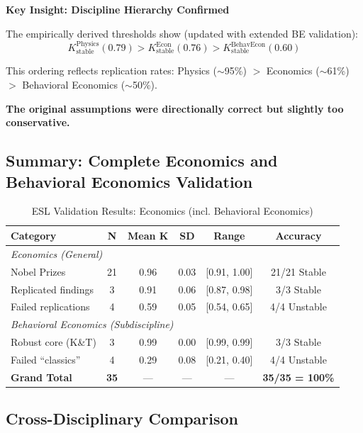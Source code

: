 \documentclass[11pt,a4paper]{article}
\begin{document}
\begin{resultbox}
\textbf{Key Insight: Discipline Hierarchy Confirmed}

The empirically derived thresholds show (updated with extended BE validation):
\[
K_{\text{stable}}^{\text{Physics}} (0.79) > K_{\text{stable}}^{\text{Econ}} (0.76) > K_{\text{stable}}^{\text{BehavEcon}} (0.60)
\]

This ordering reflects replication rates: Physics ($\sim$95\%) $>$ Economics ($\sim$61\%) $>$ Behavioral Economics ($\sim$50\%).

\textbf{The original assumptions were directionally correct but slightly too conservative.}
\end{resultbox}

\subsection{Summary: Complete Economics and Behavioral Economics Validation}

\begin{table}[h]
\centering
\caption{ESL Validation Results: Economics (incl. Behavioral Economics)}
\begin{tabular}{lccccc}
\toprule
\textbf{Category} & \textbf{N} & \textbf{Mean K} & \textbf{SD} & \textbf{Range} & \textbf{Accuracy} \\
\midrule
\multicolumn{6}{l}{\textit{Economics (General)}} \\
Nobel Prizes & 21 & 0.96 & 0.03 & [0.91, 1.00] & 21/21 Stable \\
Replicated findings & 3 & 0.91 & 0.06 & [0.87, 0.98] & 3/3 Stable \\
Failed replications & 4 & 0.59 & 0.05 & [0.54, 0.65] & 4/4 Unstable \\
\midrule
\multicolumn{6}{l}{\textit{Behavioral Economics (Subdiscipline)}} \\
Robust core (K\&T) & 3 & 0.99 & 0.00 & [0.99, 0.99] & 3/3 Stable \\
Failed ``classics'' & 4 & 0.29 & 0.08 & [0.21, 0.40] & 4/4 Unstable \\
\midrule
\textbf{Grand Total} & \textbf{35} & --- & --- & --- & \textbf{35/35 = 100\%} \\
\bottomrule
\end{tabular}
\end{table}

\subsection{Cross-Disciplinary Comparison}
\end{document}
